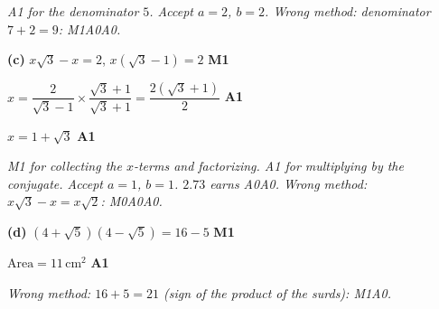 \documentclass[12pt, twoside]{article}
\begin{document}
\begin{enumerate}[itemsep=0.3cm]
\emph{A1 for the denominator $5$. Accept $a = 2$, $b = 2$. Wrong method:
denominator $7 + 2 = 9$: M1A0A0.}

\textbf{(c)} $x\sqrt{3} - x = 2$, \quad $x\left(\sqrt{3} - 1\right) = 2$ \hfill \textbf{M1}

$x = \dfrac{2}{\sqrt{3} - 1} \times \dfrac{\sqrt{3} + 1}{\sqrt{3} + 1} = \dfrac{2\left(\sqrt{3} + 1\right)}{2}$ \hfill \textbf{A1}

$x = 1 + \sqrt{3}$ \hfill \textbf{A1}

\emph{M1 for collecting the $x$-terms and factorizing. A1 for multiplying
by the conjugate. Accept $a = 1$, $b = 1$. $2.73$ earns A0A0. Wrong
method: $x\sqrt{3} - x = x\sqrt{2}$: M0A0A0.}

\textbf{(d)} $\left(4 + \sqrt{5}\right)\left(4 - \sqrt{5}\right) = 16 - 5$ \hfill \textbf{M1}

$\text{Area} = 11\,\text{cm}^{2}$ \hfill \textbf{A1}

\emph{Wrong method: $16 + 5 = 21$ (sign of the product of the surds): M1A0.}

\end{enumerate}
\end{document}
